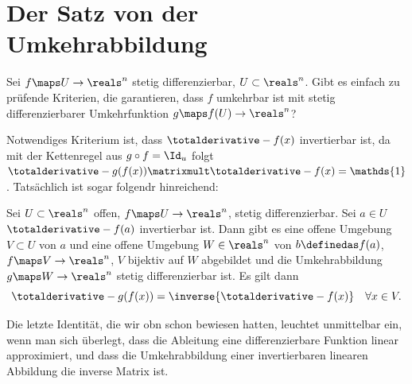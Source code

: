 \section*{Der Satz von der Umkehrabbildung}\label{satz_von_der_umkehrabbildung}
Sei \( f\maps U\to \reals^n \) stetig differenzierbar, \( U\subset \reals^n \). Gibt es einfach zu prüfende Kriterien, die garantieren, dass \( f \) umkehrbar ist mit stetig differenzierbarer Umkehrfunktion \( g\maps f(U)\to \reals^n \)?

Notwendiges Kriterium ist, dass \( \totalderivative-{f}(x) \) invertierbar ist, da mit der Kettenregel aus \( g\circ f=\Id_u \) folgt \( \totalderivative-{g}(f(x))\matrixmult \totalderivative-{f}(x)=\mathds{1} \). Tatsächlich ist sogar folgendr hinreichend:

\begin{satz}
  Sei \( U\subset \reals^n \) offen, \( f\maps U\to \reals^n \), stetig differenzierbar. Sei \( a\in U \) \sd \( \totalderivative-{f}(a) \) invertierbar ist. Dann gibt es eine offene Umgebung \( V\subset U \) von \( a \) und eine offene Umgebung \( W\in \reals^n \) von \( b\definedas f(a) \), \sd \( f\maps V\to \reals^n \), \( V \) bijektiv auf \( W \) abgebildet und die Umkehrabbildung \( g\maps W\to \reals^n \) stetig differenzierbar ist. Es gilt dann
  \begin{equation*}
    \totalderivative-{g}(f(x))=\inverse{\totalderivative-{f}(x)}\quad \forall x\in V.
  \end{equation*}
\end{satz}
\begin{bemerkung*}
  Die letzte Identität, die wir obn schon bewiesen hatten, leuchtet unmittelbar ein, wenn man sich überlegt, dass die Ableitung eine differenzierbare Funktion linear approximiert, und dass die Umkehrabbildung einer invertierbaren linearen Abbildung die inverse Matrix ist.
\end{bemerkung*}
